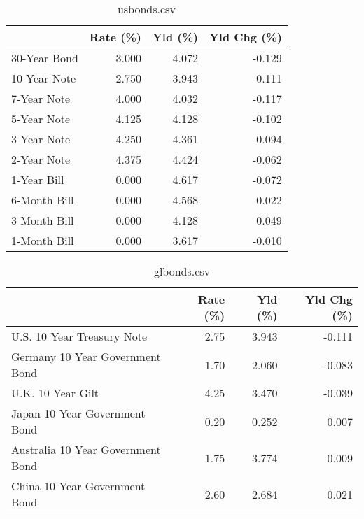 \documentclass{article}%
\begin{document}
%


\begin{table}[htbp]%
\caption{usbonds.csv}%
\centering%
\begin{adjustbox}{width=1\textwidth}%
\begin{tabular}{lrrr}
\toprule
             &  Rate (\%) &  Yld (\%) &  Yld Chg (\%) \\
\midrule
30-Year Bond &     3.000 &    4.072 &       -0.129 \\
10-Year Note &     2.750 &    3.943 &       -0.111 \\
 7-Year Note &     4.000 &    4.032 &       -0.117 \\
 5-Year Note &     4.125 &    4.128 &       -0.102 \\
 3-Year Note &     4.250 &    4.361 &       -0.094 \\
 2-Year Note &     4.375 &    4.424 &       -0.062 \\
 1-Year Bill &     0.000 &    4.617 &       -0.072 \\
6-Month Bill &     0.000 &    4.568 &        0.022 \\
3-Month Bill &     0.000 &    4.128 &        0.049 \\
1-Month Bill &     0.000 &    3.617 &       -0.010 \\
\bottomrule
\end{tabular}
%
\end{adjustbox}%
\end{table}

%


\begin{table}[htbp]%
\caption{glbonds.csv}%
\centering%
\begin{adjustbox}{width=1\textwidth}%
\begin{tabular}{lrrr}
\toprule
                                  &  Rate (\%) &  Yld (\%) &  Yld Chg (\%) \\
\midrule
       U.S. 10 Year Treasury Note &      2.75 &    3.943 &       -0.111 \\
  Germany 10 Year Government Bond &      1.70 &    2.060 &       -0.083 \\
                U.K. 10 Year Gilt &      4.25 &    3.470 &       -0.039 \\
    Japan 10 Year Government Bond &      0.20 &    0.252 &        0.007 \\
Australia 10 Year Government Bond &      1.75 &    3.774 &        0.009 \\
    China 10 Year Government Bond &      2.60 &    2.684 &        0.021 \\
\bottomrule
\end{tabular}
%
\end{adjustbox}%
\end{table}
\end{document}
